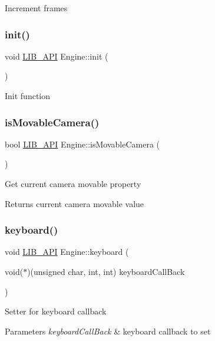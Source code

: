 Increment frames \mbox{\label{classEngine_ae675127bbb7671464d1d7ad94818a17a}} 
\subsubsection{\texorpdfstring{init()}{init()}}
{\footnotesize\ttfamily void \hyperlink{Engine_8h_a77278c8cc96e39fb27b5d0a347c8fb3d}{L\+I\+B\+\_\+\+A\+PI} Engine\+::init (\begin{DoxyParamCaption}{ }\end{DoxyParamCaption})}

Init function \mbox{\label{classEngine_afcd6a7929f45ee442c5276b6f69d0f75}} 
\subsubsection{\texorpdfstring{is\+Movable\+Camera()}{isMovableCamera()}}
{\footnotesize\ttfamily bool \hyperlink{Engine_8h_a77278c8cc96e39fb27b5d0a347c8fb3d}{L\+I\+B\+\_\+\+A\+PI} Engine\+::is\+Movable\+Camera (\begin{DoxyParamCaption}{ }\end{DoxyParamCaption})}

Get current camera movable property \begin{DoxyReturn}{Returns}
current camera movable value 
\end{DoxyReturn}
\mbox{\label{classEngine_a5ddd680e42a9c0a655af665611ddd279}} 
\subsubsection{\texorpdfstring{keyboard()}{keyboard()}}
{\footnotesize\ttfamily void \hyperlink{Engine_8h_a77278c8cc96e39fb27b5d0a347c8fb3d}{L\+I\+B\+\_\+\+A\+PI} Engine\+::keyboard (\begin{DoxyParamCaption}\item[{void($\ast$)(unsigned char, int, int)}]{keyboard\+Call\+Back }\end{DoxyParamCaption})}

Setter for keyboard callback 
\begin{DoxyParams}{Parameters}
{\em keyboard\+Call\+Back} & keyboard callback to set \\
\hline
\end{DoxyParams}
\mbox{\label{classEngine_a2e7d54bf7a41c23afce2934967cf09de}} 
